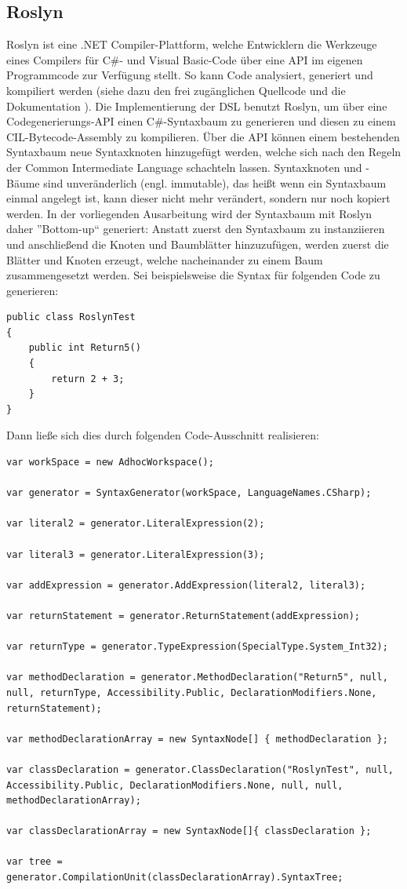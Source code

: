 \subsection{Roslyn}
\label{subsec:Roslyn}
Roslyn ist eine .NET Compiler-Plattform, welche Entwicklern die Werkzeuge eines Compilers für C\#- und Visual Basic-Code über eine API im eigenen Programmcode zur Verfügung stellt. So kann Code analysiert, generiert und kompiliert werden (siehe dazu den frei zugänglichen Quellcode und die Dokumentation \cite{Roslyn}). Die Implementierung der DSL benutzt Roslyn, um über eine Codegenerierungs-API einen C\#-Syntaxbaum zu generieren und diesen zu einem CIL-Bytecode-Assembly zu kompilieren. Über die API können einem bestehenden Syntaxbaum neue Syntaxknoten hinzugefügt werden, welche sich nach den Regeln der Common Intermediate Language schachteln lassen. Syntaxknoten und -Bäume sind unveränderlich (engl. immutable), das heißt wenn ein Syntaxbaum einmal angelegt ist, kann dieser nicht mehr verändert, sondern nur noch kopiert werden. In der vorliegenden Ausarbeitung wird der Syntaxbaum mit Roslyn daher ''Bottom-up`` generiert: Anstatt zuerst den Syntaxbaum zu instanziieren und anschließend die Knoten und Baumblätter hinzuzufügen, werden zuerst die Blätter und Knoten erzeugt, welche nacheinander zu einem Baum zusammengesetzt werden. Sei beispielsweise die Syntax für folgenden Code zu generieren:
\noindent
\begin{lstlisting}[language=custom]
public class RoslynTest
{
    public int Return5()
    {
        return 2 + 3;
    }
}
\end{lstlisting}

Dann ließe sich dies durch folgenden Code-Ausschnitt realisieren:
\noindent
\begin{lstlisting}[language=custom]
var workSpace = new AdhocWorkspace();

var generator = SyntaxGenerator(workSpace, LanguageNames.CSharp);

var literal2 = generator.LiteralExpression(2);

var literal3 = generator.LiteralExpression(3);

var addExpression = generator.AddExpression(literal2, literal3);

var returnStatement = generator.ReturnStatement(addExpression);

var returnType = generator.TypeExpression(SpecialType.System_Int32);

var methodDeclaration = generator.MethodDeclaration("Return5", null, null, returnType, Accessibility.Public, DeclarationModifiers.None, returnStatement);

var methodDeclarationArray = new SyntaxNode[] { methodDeclaration };

var classDeclaration = generator.ClassDeclaration("RoslynTest", null, Accessibility.Public, DeclarationModifiers.None, null, null, methodDeclarationArray);

var classDeclarationArray = new SyntaxNode[]{ classDeclaration };

var tree = generator.CompilationUnit(classDeclarationArray).SyntaxTree;
\end{lstlisting}

